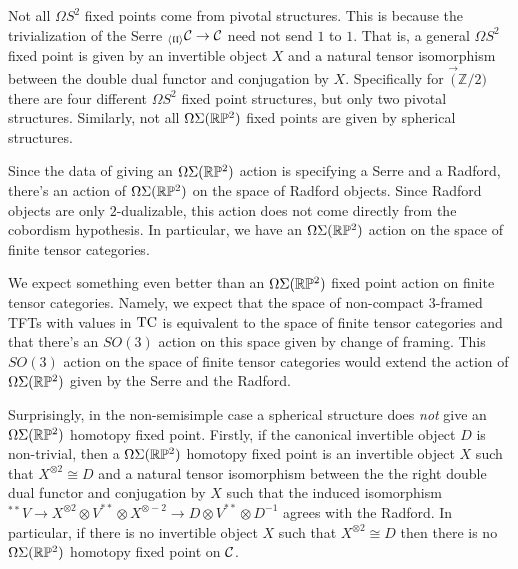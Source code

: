 \documentclass{amsart}
\begin{document}
\begin{warning}
Not all $\Omega S^2$ fixed points come from pivotal structures.  This is because the trivialization of the Serre ${}_{\langle \mathfrak{l l} \rangle} \mathcal C \rightarrow \mathcal C$ need not send $1$ to $1$.  That is, a general $\Omega S^2$ fixed point is given by an invertible object $X$ and a natural tensor isomorphism between the double dual functor and conjugation by $X$.  Specifically for $\Vec(\mathbb{Z}/2)$ there are four different $\Omega S^2$ fixed point structures, but only two pivotal structures.  Similarly, not all $\Omega \Sigma (\mathbb R \mathbb P^2)$ fixed points are given by spherical structures.
\end{warning}

Since the data of giving an $\Omega \Sigma (\mathbb R \mathbb P^2)$ action is specifying a Serre and a Radford, there's an action of $\Omega \Sigma (\mathbb R \mathbb P^2)$ on the space of Radford objects.  Since Radford objects are only $2$-dualizable, this action does not come directly from the cobordism hypothesis.  In particular, we have an $\Omega \Sigma (\mathbb R \mathbb P^2)$ action on the space of finite tensor categories.  

\begin{remark}
We expect something even better than an $\Omega \Sigma (\mathbb R \mathbb P^2)$ fixed point action on finite tensor categories.  Namely, we expect that the space of non-compact $3$-framed TFTs with values in $\mathrm{TC}$ is equivalent to the space of finite tensor categories and that there's an $SO(3)$ action on this space given by change of framing.  This $SO(3)$ action on the space of finite tensor categories would extend the action of $\Omega \Sigma (\mathbb R \mathbb P^2)$ given by the Serre and the Radford.
 \end{remark}

Surprisingly, in the non-semisimple case a spherical structure does \emph{not} give an $\Omega \Sigma (\mathbb R \mathbb P^2)$ homotopy fixed point.  Firstly, if the canonical invertible object $D$ is non-trivial, then a $\Omega \Sigma (\mathbb R \mathbb P^2)$ homotopy fixed point is an invertible object $X$ such that $X^{\otimes 2} \cong D$ and a natural tensor isomorphism between the the right double dual functor and conjugation by $X$ such that the induced isomorphism ${}^{**}V \rightarrow X^{\otimes 2} \otimes V^{**} \otimes X^{\otimes -2} \rightarrow D \otimes V^{**} \otimes D^{-1}$ agrees with the Radford.  In particular, if there is no invertible object $X$ such that $X^{\otimes 2} \cong D$ then there is no $\Omega \Sigma (\mathbb R \mathbb P^2)$ homotopy fixed point on $\mathcal C$.
\end{document}
